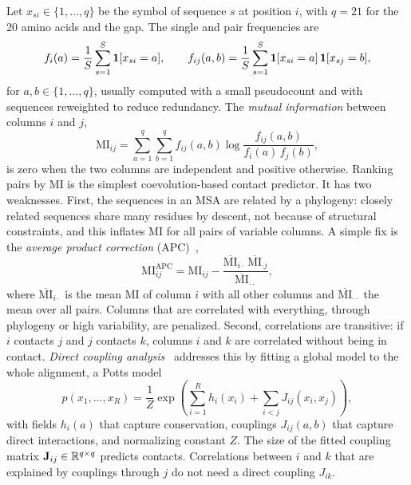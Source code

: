 Let $x_{si}\in\{1,\dots,q\}$ be the symbol of sequence $s$ at position $i$, with $q=21$ for the 20 amino acids and the gap. The single and pair frequencies are
\begin{equation}
  f_i(a) = \frac{1}{S}\sum_{s=1}^S \mathbf{1}[x_{si}=a], \qquad
  f_{ij}(a,b) = \frac{1}{S}\sum_{s=1}^S \mathbf{1}[x_{si}=a]\,\mathbf{1}[x_{sj}=b],
  \label{eq:msa_freqs}
\end{equation}
for $a,b\in\{1,\dots,q\}$, usually computed with a small pseudocount and with sequences reweighted to reduce redundancy. The \emph{mutual information} between columns $i$ and $j$,
\begin{equation}
  \text{MI}_{ij} = \sum_{a=1}^q\sum_{b=1}^q f_{ij}(a,b)\log\frac{f_{ij}(a,b)}{f_i(a)\,f_j(b)},
\end{equation}
is zero when the two columns are independent and positive otherwise. Ranking pairs by MI is the simplest coevolution-based contact predictor. It has two weaknesses. First, the sequences in an MSA are related by a phylogeny: closely related sequences share many residues by descent, not because of structural constraints, and this inflates MI for all pairs of variable columns. A simple fix is the \emph{average product correction} (APC)~\citep{dunn2008},
\begin{equation}
  \text{MI}^{\text{APC}}_{ij} = \text{MI}_{ij} - \frac{\overline{\text{MI}}_{i\cdot}\,\overline{\text{MI}}_{\cdot j}}{\overline{\text{MI}}_{\cdot\cdot}},
\end{equation}
where $\overline{\text{MI}}_{i\cdot}$ is the mean MI of column $i$ with all other columns and $\overline{\text{MI}}_{\cdot\cdot}$ the mean over all pairs. Columns that are correlated with everything, through phylogeny or high variability, are penalized. Second, correlations are transitive: if $i$ contacts $j$ and $j$ contacts $k$, columns $i$ and $k$ are correlated without being in contact. \emph{Direct coupling analysis}~\citep{morcos2011,marks2011} addresses this by fitting a global model to the whole alignment, a Potts model
\begin{equation}
  p(x_1,\dots,x_R) = \frac{1}{Z}\exp\left(\sum_{i=1}^R h_i(x_i) + \sum_{i<j} J_{ij}(x_i,x_j)\right),
  \label{eq:potts}
\end{equation}
with fields $h_i(a)$ that capture conservation, couplings $J_{ij}(a,b)$ that capture direct interactions, and normalizing constant $Z$. The size of the fitted coupling matrix $\mathbf{J}_{ij}\in\mathbb{R}^{q\times q}$ predicts contacts. Correlations between $i$ and $k$ that are explained by couplings through $j$ do not need a direct coupling $J_{ik}$.


